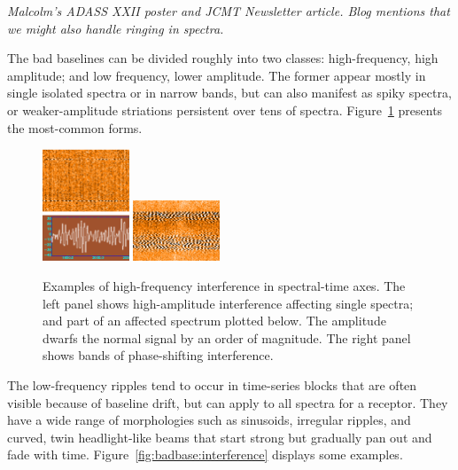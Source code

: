 \documentclass[final,authoryear,5p,times,twocolumn]{elsarticle}
\begin{document}
\textit{Malcolm's ADASS XXII poster and JCMT Newsletter article. Blog mentions
that we might also handle ringing in spectra.}

The bad baselines can be divided roughly into two classes:
high-frequency, high amplitude; and low frequency, lower
amplitude. The former appear mostly in single isolated spectra or in
narrow bands, but can also manifest as spiky spectra, or
weaker-amplitude striations persistent over tens of spectra.
Figure~\ref{fig:badbase:highfreq} presents the most-common forms.

\begin{figure}[!ht]
\includegraphics[width=0.23\textwidth]{P61_f1a}
\includegraphics[width=0.23\textwidth]{P61_f1b}
\caption{Examples of high-frequency interference in spectral-time
  axes. The left panel shows high-amplitude interference affecting
  single spectra; and part of an affected spectrum plotted below. The
  amplitude dwarfs the normal signal by an order of magnitude. The
  right panel shows bands of phase-shifting interference.}
\label{fig:badbase:highfreq}
\end{figure}

The low-frequency ripples tend to occur in time-series blocks that are
often visible because of baseline drift, but can apply to all spectra
for a receptor. They have a wide range of morphologies such as
sinusoids, irregular ripples, and curved, twin headlight-like beams
that start strong but gradually pan out and fade with time.
Figure~\ref{fig:badbase:interference} displays some examples.
\end{document}
